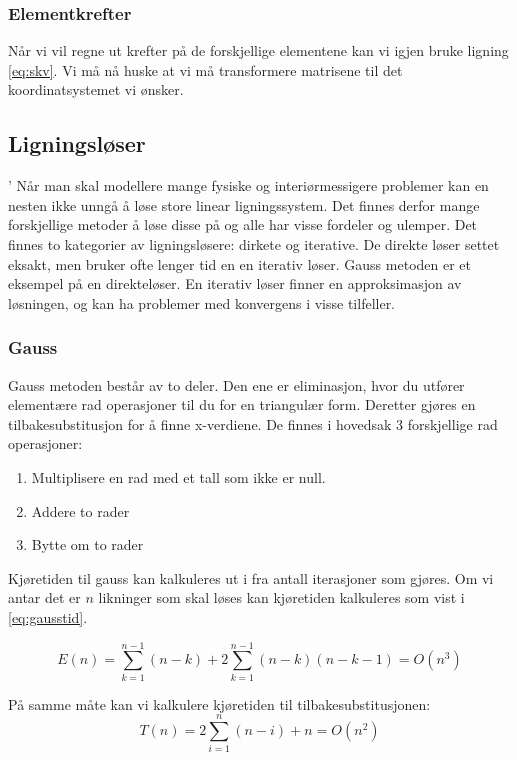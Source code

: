 \documentclass[10pt,a4paper, norsk]{article}
\begin{document}
\subsubsection*{Elementkrefter}
Når vi vil regne ut krefter på de forskjellige elementene kan vi igjen bruke ligning \ref{eq:skv}. Vi må nå huske at vi må transformere matrisene til det koordinatsystemet vi ønsker. 


\subsection*{Ligningsløser}'
Når man skal modellere mange fysiske og interiørmessigere problemer kan en nesten ikke unngå å løse store linear ligningssystem. Det finnes derfor mange forskjellige metoder å løse disse på og alle har visse fordeler og ulemper.
Det finnes to kategorier av ligningsløsere: dirkete og iterative. De direkte løser settet eksakt, men bruker ofte lenger tid en en iterativ løser. Gauss metoden er et eksempel på en direkteløser. En iterativ løser finner en approksimasjon av løsningen, og kan ha problemer med konvergens i visse tilfeller. 

\subsubsection*{Gauss}

Gauss metoden består av to deler. Den ene er eliminasjon, hvor du utfører elementære rad operasjoner til du for en triangulær form. Deretter gjøres en tilbakesubstitusjon for å finne x-verdiene. De finnes i hovedsak 3 forskjellige rad operasjoner:
\begin{enumerate}
\item Multiplisere en rad med et tall som ikke er null.
\item Addere to rader
\item Bytte om to rader
\end{enumerate}

Kjøretiden til gauss kan kalkuleres ut i fra antall iterasjoner som gjøres. Om vi antar det er $n$ likninger som skal løses kan kjøretiden kalkuleres som vist i \eqref{eq:gausstid}.

\begin{equation} \label{eq:gausstid}
E(n) = \sum_{k=1}^{n-1} (n-k) + 2 \sum_{k=1}^{n-1} (n-k)(n-k-1) = O(n^3)
\end{equation}

På samme måte kan vi kalkulere kjøretiden til tilbakesubstitusjonen:
\begin{equation} \label{eq:gaussseideltid}
T(n) = 2\sum_{i=1}^{n} (n-i) + n = O(n^2)
\end{equation}
\end{document}
